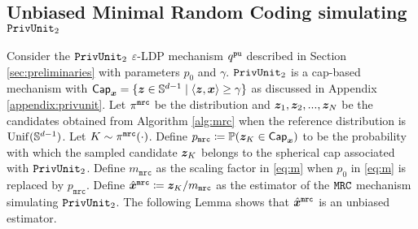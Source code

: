 \subsection{Unbiased Minimal Random Coding simulating \texorpdfstring{$\texttt{PrivUnit}_2$}{PrivUnit}}\label{appendix:debias_mrc}
Consider the $\texttt{PrivUnit}_2$ $\varepsilon$-LDP mechanism $q^{\texttt{pu}}$ described in Section \ref{sec:preliminaries} with parameters $p_0$ and $\gamma$. $\texttt{PrivUnit}_2$ is a cap-based mechanism with $\mathsf{Cap}_{{\boldsymbol{x}}} = \{{\boldsymbol{z}} \in \mathbb{S}^{d-1} \mid
\langle {\boldsymbol{z}}, {\boldsymbol{x}}  \rangle \ge \gamma\}$ as discussed in Appendix \ref{appendix:privunit}. Let $\pi^{\texttt{mrc}}$ be the distribution and ${\boldsymbol{z}}_1, {\boldsymbol{z}}_2,...,{\boldsymbol{z}}_N$ be the candidates obtained from Algorithm \ref{alg:mrc} when the reference distribution is $\mathrm{Unif}(\mathbb{S}^{d-1})$. Let  $K \sim \pi^{\texttt{mrc}}(\cdot)$. Define $p_{\texttt{mrc}} \coloneqq \mathbb{P}({\boldsymbol{z}}_K \in \mathsf{Cap}_{{\boldsymbol{x}}})$
to be the probability with which the sampled candidate ${\boldsymbol{z}}_K$ belongs to the spherical cap associated with $\texttt{PrivUnit}_2$.
Define $m_{\texttt{mrc}}$ as the scaling factor in \eqref{eq:m} when $p_0$ in \eqref{eq:m} is replaced by $p_{\texttt{mrc}}$. Define $\hat{{\boldsymbol{x}}}^\texttt{mrc} \coloneqq {\boldsymbol{z}}_K / m_\texttt{mrc}$ as the estimator of the $\texttt{MRC}$ mechanism simulating $\texttt{PrivUnit}_2$.  The following Lemma shows that $\hat{{\boldsymbol{x}}}^\texttt{mrc}$ is an unbiased estimator.


